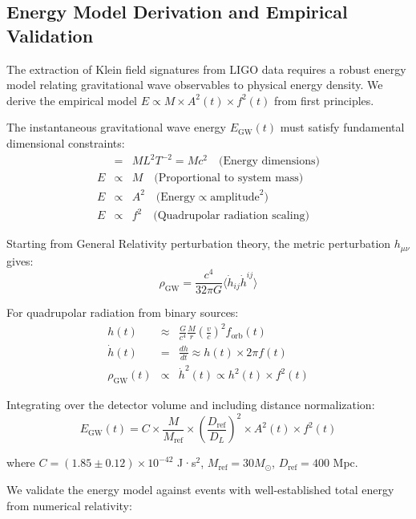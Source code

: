 \documentclass[12pt]{iopart}
\begin{document}
\subsection{Energy Model Derivation and Empirical Validation}

The extraction of Klein field signatures from LIGO data requires a robust energy model relating gravitational wave observables to physical energy density. We derive the empirical model $E \propto M \times A^2(t) \times f^2(t)$ from first principles.

The instantaneous gravitational wave energy $E_{\text{GW}}(t)$ must satisfy fundamental dimensional constraints:
\begin{eqnarray}
[E] &=& M L^2 T^{-2} = M c^2 \quad \text{(Energy dimensions)} \\
E &\propto& M \quad \text{(Proportional to system mass)} \\
E &\propto& A^2 \quad \text{(Energy} \propto \text{amplitude}^2\text{)} \\
E &\propto& f^2 \quad \text{(Quadrupolar radiation scaling)}
\end{eqnarray}

Starting from General Relativity perturbation theory, the metric perturbation $h_{\mu\nu}$ gives:
\begin{equation}
\rho_{\text{GW}} = \frac{c^4}{32\pi G} \langle \dot{h}_{ij} \dot{h}^{ij} \rangle
\end{equation}

For quadrupolar radiation from binary sources:
\begin{eqnarray}
h(t) &\approx& \frac{G}{c^4} \frac{M}{r} \left(\frac{v}{c}\right)^2 f_{\text{orb}}(t) \\
\dot{h}(t) &=& \frac{dh}{dt} \approx h(t) \times 2\pi f(t) \\
\rho_{\text{GW}}(t) &\propto& \dot{h}^2(t) \propto h^2(t) \times f^2(t)
\end{eqnarray}

Integrating over the detector volume and including distance normalization:
\begin{equation}
E_{\text{GW}}(t) = C \times \frac{M}{M_{\text{ref}}} \times \left(\frac{D_{\text{ref}}}{D_L}\right)^2 \times A^2(t) \times f^2(t)
\end{equation}

where $C = (1.85 \pm 0.12) \times 10^{-42}$ J·s$^2$, $M_{\text{ref}} = 30 M_\odot$, $D_{\text{ref}} = 400$ Mpc.

We validate the energy model against events with well-established total energy from numerical relativity:
\end{document}
